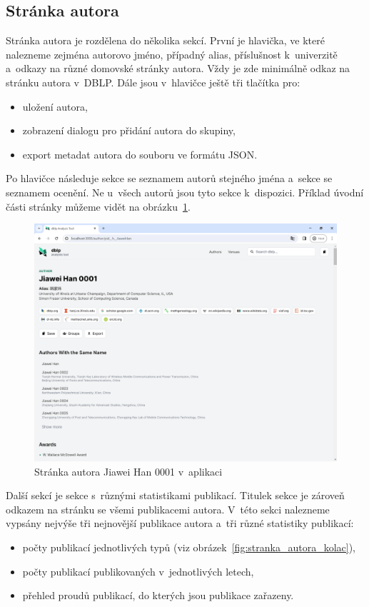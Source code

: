 \documentclass[
  biblatex,
  sourcecodes,
  glossaries,
  index
]{kidiplom}
\begin{document}
\subsection{Stránka autora}

Stránka autora je rozdělena do několika sekcí. První je hlavička, ve které nalezneme zejména autorovo jméno, případný alias, příslušnost k~univerzitě a~odkazy na různé domovské stránky autora. Vždy je zde minimálně odkaz na stránku autora v~DBLP. Dále jsou v~hlavičce ještě tři tlačítka pro: 
\begin{itemize}
\item uložení autora,
\item zobrazení dialogu pro přidání autora do skupiny,
\item export metadat autora do souboru ve formátu JSON.
\end{itemize}

Po hlavičce následuje sekce se seznamem autorů stejného jména a~sekce se seznamem ocenění. Ne u~všech autorů jsou tyto sekce k~dispozici. Příklad úvodní části stránky můžeme vidět na obrázku~\ref{fig:stranka_autora_hlavicka}. 

\begin{figure}[H]
\begin{center}
\includegraphics[width=\textwidth]{stranka_autora_hlavicka}
\caption{Stránka autora Jiawei Han 0001 v~aplikaci}\label{fig:stranka_autora_hlavicka}
\end{center}
\end{figure}

Další sekcí je sekce s~různými statistikami publikací. Titulek sekce je zároveň odkazem na stránku se všemi publikacemi autora. V~této sekci nalezneme vypsány nejvýše tři nejnovější publikace autora a~tři různé statistiky publikací:
\begin{itemize}
\item počty publikací jednotlivých typů (viz obrázek~\ref{fig:stranka_autora_kolac}),
\item počty publikací publikovaných v~jednotlivých letech,
\item přehled proudů publikací, do kterých jsou publikace zařazeny.
\end{itemize}
\end{document}
